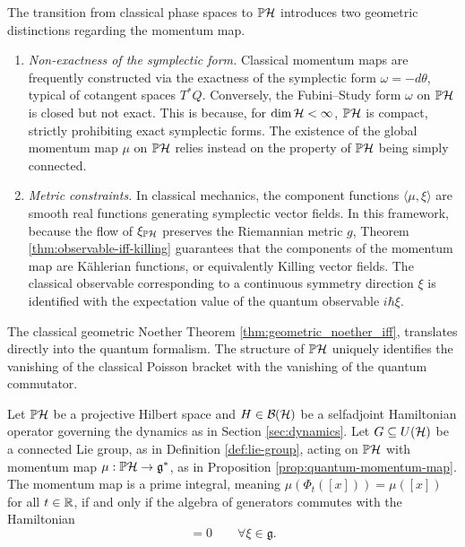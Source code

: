 \begin{remark}
	\label{rem:momentum-differences}
	The transition from classical phase spaces to $\PH$ introduces two  geometric distinctions regarding the momentum map.
	\begin{enumerate}
		\item \emph{Non-exactness of the symplectic form.} Classical momentum maps are frequently constructed via the exactness of the symplectic form $\omega = -d\theta$, typical of cotangent spaces $T^*Q$. Conversely, the Fubini--Study form $\omega$ on $\PH$ is closed but not exact. This is because, for $\dim \H < \infty$, $\PH$ is compact, strictly prohibiting exact symplectic forms. The existence of the global momentum map $\mu$ on $\PH$ relies instead on the property of $\PH$ being simply connected.
		\item \emph{Metric constraints.} In classical mechanics, the component functions $\langle \mu, \xi \rangle$ are smooth real functions generating symplectic vector fields. In this framework, because the flow of $\xi_{\PH}$ preserves the Riemannian metric $g$, Theorem \ref{thm:observable-iff-killing} guarantees that the components of the momentum map are Kählerian functions, or equivalently Killing vector fields. The classical observable corresponding to a continuous symmetry direction $\xi$ is identified with the expectation value of the quantum observable $i\hbar\xi$.
	\end{enumerate}
\end{remark}

The classical geometric Noether Theorem \ref{thm:geometric_noether_iff}, translates directly into the quantum formalism. The structure of $\PH$ uniquely identifies the vanishing of the classical Poisson bracket with the vanishing of the quantum commutator.

\begin{theorem}
	\label{thm:quantum-noether}
	Let $\PH$ be a projective Hilbert space and $H \in \BH$ be a selfadjoint Hamiltonian operator governing the dynamics as in Section \ref{sec:dynamics}. Let $G \subseteq U(\H)$ be a connected Lie group, as in Definition \ref{def:lie-group}, acting on $\PH$ with momentum map $\mu: \PH \to \mathfrak{g}^*$, as in Proposition \ref{prop:quantum-momentum-map}. The momentum map is a prime integral, meaning $\mu(\Phi_t([x])) = \mu([x])$ for all $t \in \mathbb{R}$, if and only if the algebra of generators commutes with the Hamiltonian
	\begin{equation}
		[H, i\hbar \xi] = 0 \qquad \forall \xi \in \mathfrak{g}.
	\end{equation}
\end{theorem}

